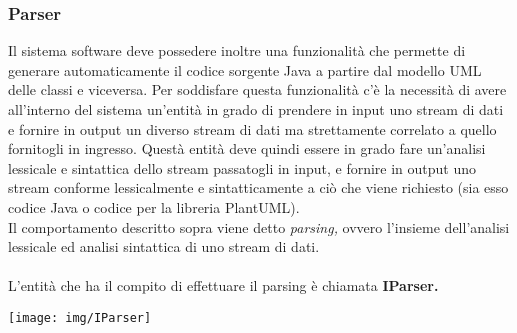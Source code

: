 \documentclass{article}
\begin{document}
  \subsubsection{Parser}
  Il sistema software deve possedere inoltre una funzionalità che permette di generare automaticamente il codice sorgente Java a partire dal modello UML delle
  classi e viceversa. Per soddisfare questa funzionalità c'è la necessità di avere all'interno del sistema un'entità in grado di prendere in input uno stream di dati
  e fornire in output un diverso stream di dati ma strettamente correlato a quello fornitogli in ingresso. Questà entità deve quindi essere in grado fare
  un'analisi lessicale e sintattica dello stream passatogli in input, e fornire in output uno stream conforme lessicalmente e sintatticamente a ciò che viene
  richiesto (sia esso codice Java o codice per la libreria PlantUML).\\
  Il comportamento descritto sopra viene detto \textit{parsing,} ovvero l'insieme dell'analisi lessicale ed analisi sintattica di uno stream di dati.\\
  \\L'entità che ha il compito di effettuare il parsing è chiamata \textbf{IParser.}
  \begin{center}
    \texttt{[image: img/IParser]}
  \end{center}
\end{document}

